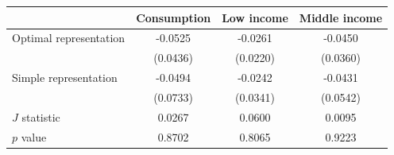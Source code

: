 \begin{threeparttable}
\begin{tabular}{l | ccc}
\toprule
 & \multicolumn{1}{c}{Consumption} & \multicolumn{1}{c}{Low income} & \multicolumn{1}{c}{Middle income} \\
\midrule
  Optimal representation & -0.0525 & -0.0261 & -0.0450 \\
           & (0.0436) & (0.0220) & (0.0360) \\
\addlinespace[0.3em]
  Simple representation & -0.0494 & -0.0242 & -0.0431 \\
           & (0.0733) & (0.0341) & (0.0542) \\
\midrule
  $J$ statistic & 0.0267 & 0.0600 & 0.0095 \\
  $p$ value     & 0.8702 & 0.8065 & 0.9223 \\
\bottomrule
\end{tabular}
\end{threeparttable}
